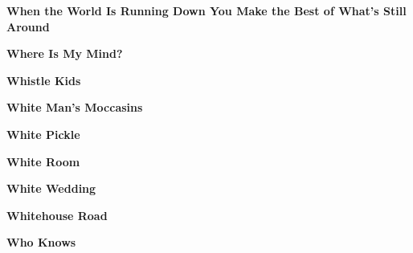 \newline
\vspace{10pt} 
\begin{center}\textbf{When the World Is Running Down You Make the Best of What's Still Around}\end{center}
\newline
\vspace{10pt} 
\begin{center}\textbf{Where Is My Mind?}\end{center}
\newline
\vspace{10pt} 
\begin{center}\textbf{Whistle Kids}\end{center}
\newline
\vspace{10pt} 
\begin{center}\textbf{White Man's Moccasins}\end{center}
\newline
\vspace{10pt} 
\begin{center}\textbf{White Pickle}\end{center}
\newline
\vspace{10pt} 
\begin{center}\textbf{White Room}\end{center}
\newline
\vspace{10pt} 
\begin{center}\textbf{White Wedding}\end{center}
\newline
\vspace{10pt} 
\begin{center}\textbf{Whitehouse Road}\end{center}
\newline
\vspace{10pt} 
\begin{center}\textbf{Who Knows}\end{center}
\newline
